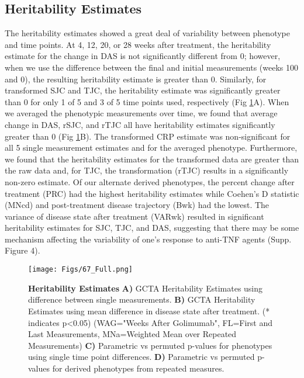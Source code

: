 \subsection*{Heritability Estimates}

The heritability estimates showed a great deal of variability between phenotype and time points. At 4, 12, 20, or 28 weeks after treatment, the heritability estimate for the change in DAS is not significantly different from 0; however, when we use the difference between the final and initial measurements (weeks 100 and 0), the resulting heritability estimate is greater than 0. Similarly, for transformed SJC and TJC, the heritability estimate was significantly greater than 0 for only 1 of 5 and 3 of 5 time points used, respectively (Fig \ref{FIG_67}A). When we averaged the phenotypic measurements over time, we found that average change in DAS, rSJC, and rTJC all have heritability estimates significantly greater than 0 (Fig \ref{FIG_67}B). The transformed CRP estimate was non-significant for all 5 single measurement estimates and for the averaged phenotype. Furthermore, we found that the heritability estimates for the transformed data are greater than the raw data and, for TJC, the transformation (rTJC) results in a significantly non-zero estimate. Of our alternate derived phenotypes, the percent change after treatment (PRC) had the highest heritability estimates while Coehen’s D statistic (MNcd) and post-treatment disease trajectory (Bwk) had the lowest. The variance of disease state after treatment (VARwk) resulted in significant heritability estimates for SJC, TJC, and DAS, suggesting that there may be some mechanism affecting the variability of one’s response to anti-TNF agents (Supp. Figure 4).


\begin{figure}[h!]
  \centering
  \texttt{[image: Figs/67\_Full.png]}
  \caption{ {\bf Heritability Estimates} {\bf A)} GCTA Heritability Estimates using difference between single measurements. {\bf B)} GCTA Heritability Estimates using mean difference in disease state after treatment. (* indicates p<0.05) (WAG="Weeks After Golimumab", FL=First and Last Measurements, MNa=Weighted Mean over Repeated Measurements) {\bf C)} Parametric vs permuted p-values for phenotypes using single time point differences. {\bf D)} Parametric vs permuted p-values for derived phenotypes from repeated measures. }
  \label{FIG_67}
\end{figure}

